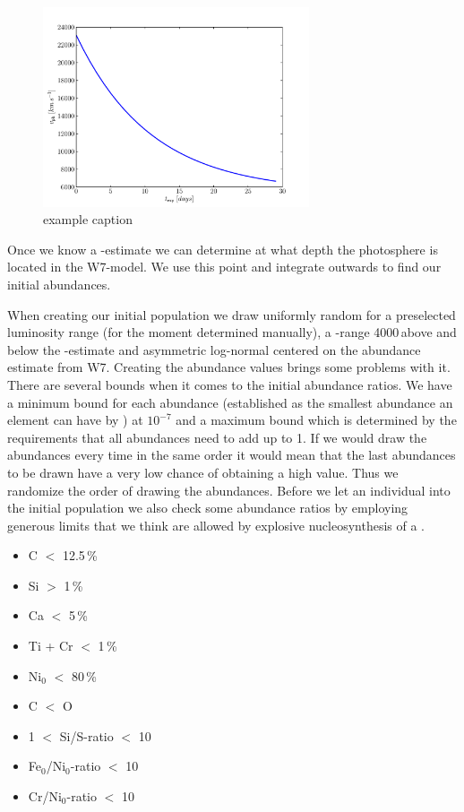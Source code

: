 \begin{figure}[htbp] %
   \centering
   \includegraphics[width=0.7\textwidth]{chapter_dalek/plots/plot_texp_vph.pdf} 
   \caption{example caption}
   \label{fig:Intrinsic }
\end{figure} 

Once we know a \vph-estimate we can determine at what depth the photosphere is located in the W7-model. We use this point and integrate outwards to find our initial abundances.

When creating our initial population we draw uniformly random for a preselected luminosity range (for the moment determined manually), a \vph-range 4000\,\kms above and below the \vph-estimate and asymmetric log-normal centered on the abundance estimate from W7. Creating the abundance values brings some problems with it. There are several bounds when it comes to the initial abundance ratios. We have a minimum bound for each abundance (established as the smallest abundance an element can have by \mlc) at $10^{-7}$ and a maximum bound which is determined by the requirements that all abundances need to add up to 1. If we would draw the abundances every time in the same order it would mean that the last abundances to be drawn have a very low chance of obtaining a high value. Thus we randomize the order of drawing the abundances.  Before we let an individual into the initial population we also check some abundance ratios by employing generous limits that we think are allowed by explosive nucleosynthesis of a \cowd. 

\begin{itemize}
\item C $<$ 12.5\,\%
\item Si $>$ 1\,\%
\item Ca $<$ 5\,\%
\item Ti + Cr $<$ 1\,\%
\item $\textrm{Ni}_0$ $<$ 80\,\%
\item C $<$ O
\item 1 $<$ Si/S-ratio $<$ 10
\item Fe$_0$/Ni$_0$-ratio $<$ 10
\item Cr/Ni$_0$-ratio $<$ 10
\end{itemize}

